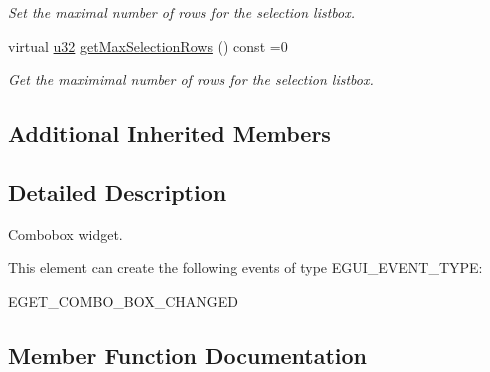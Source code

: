 \begin{DoxyCompactItemize}
\begin{DoxyCompactList}\small\item\em Set the maximal number of rows for the selection listbox. \end{DoxyCompactList}\item 
\mbox{\label{classirr_1_1gui_1_1IGUIComboBox_afc75706835598a9016ce8a8f020c690c}} 
virtual \hyperlink{namespaceirr_a0416a53257075833e7002efd0a18e804}{u32} \hyperlink{classirr_1_1gui_1_1IGUIComboBox_afc75706835598a9016ce8a8f020c690c}{get\+Max\+Selection\+Rows} () const =0
\begin{DoxyCompactList}\small\item\em Get the maximimal number of rows for the selection listbox. \end{DoxyCompactList}\end{DoxyCompactItemize}
\subsection*{Additional Inherited Members}


\subsection{Detailed Description}
Combobox widget. 

\begin{DoxyParagraph}{This element can create the following events of type E\+G\+U\+I\+\_\+\+E\+V\+E\+N\+T\+\_\+\+T\+Y\+PE\+:}
\begin{DoxyItemize}
\item E\+G\+E\+T\+\_\+\+C\+O\+M\+B\+O\+\_\+\+B\+O\+X\+\_\+\+C\+H\+A\+N\+G\+ED \end{DoxyItemize}

\end{DoxyParagraph}


\subsection{Member Function Documentation}
\mbox{\label{classirr_1_1gui_1_1IGUIComboBox_aa6a351f80aa57374459a9d66f416ce3c}} 
